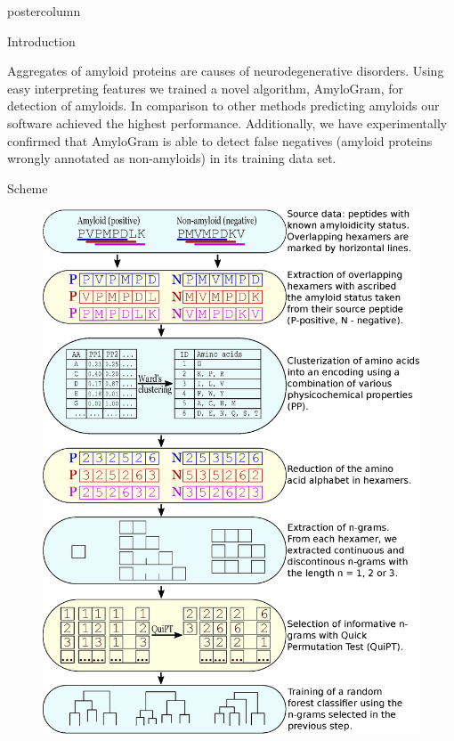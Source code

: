 \documentclass[final]{beamer}\usepackage[]{graphicx}\usepackage[]{color}
\newlength{\columnheight}
\begin{document}
\begin{frame}
\begin{columns}
\begin{column}{.53\textwidth}
\begin{beamercolorbox}[center,wd=\textwidth]{postercolumn}
\begin{minipage}[T]{.95\textwidth}
\parbox[t][\columnheight]{\textwidth}
{
\begin{block}{Introduction}


Aggregates of amyloid proteins are causes of neurodegenerative disorders. Using easy interpreting features we trained a novel algorithm, AmyloGram, for detection of amyloids. In comparison to other methods predicting amyloids our software achieved the highest performance. Additionally, we have experimentally confirmed that AmyloGram is able to detect false negatives (amyloid proteins wrongly annotated as non-amyloids) in its training data set.

    \end{block}

\begin{block}{Scheme}
\begin{figure} 
\includegraphics[width=0.78\columnwidth]{static_figure/ngram_scheme_poster.eps}
\end{figure}


\end{block}}
\end{minipage}
\end{beamercolorbox}
\end{column}
\end{columns}
\end{frame}
\end{document}
